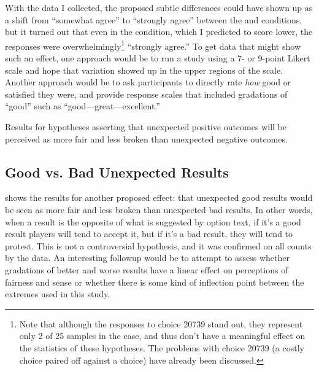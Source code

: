 With the data I collected, the proposed subtle differences could have shown up as a shift from ``somewhat agree'' to ``strongly agree'' between the \exps{} and \obvsm{} conditions, but it turned out that even in the \exps{} condition, which I predicted to score lower, the responses were overwhelmingly\footnote{%
Note that although the responses to choice 20739 stand out, they represent only 2 of 25 samples in the \obvsm{} case, and thus don't have a meaningful effect on the statistics of these hypotheses.
%
The problems with choice 20739 (a costly choice paired off against a  choice) have already been discussed.%
}\hspace{0.1em} ``strongly agree.''
%
To get data that might show such an effect, one approach would be to run a study using a 7- or 9-point Likert scale and hope that variation showed up in the upper regions of the scale.
%
Another approach would be to ask participants to directly rate \emph{how} good or satisfied they were, and provide response scales that included gradations of ``good'' such as ``good---great---excellent.''


\begin{table}[!t]
\centering
\bgroup
\def\arraystretch{1.3}
\setlength{\tabcolsep}{0.6em}

\egroup
\caption[Retrospective good vs\@. bad unexpected results]{Results for hypotheses asserting that unexpected positive outcomes will be perceived as more fair and less broken than unexpected negative outcomes.}
  \label{tab:e2-good-vs-bad-unexpected-results}
\end{table}

\subsection{Good vs\@. Bad Unexpected Results}

 shows the results for another proposed effect: that unexpected good results would be seen as more fair and less broken than unexpected bad results.
%
In other words, when a result is the opposite of what is suggested by option text, if it's a good result players will tend to accept it, but if it's a bad result, they will tend to protest.
%
This is not a controversial hypothesis, and it was confirmed on all counts by the data.
%
An interesting followup would be to attempt to assess whether gradations of better and worse results have a linear effect on perceptions of fairness and sense or whether there is some kind of inflection point between the extremes used in this study.


